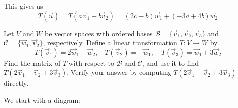\documentclass{ximera}
\begin{document}
\begin{exploration}
This gives us
$$T(\vec{u})=T(a\vec{v}_1+b\vec{v}_2)=(2a-b)\vec{w}_1+(-3a+4b)\vec{w}_2$$

\end{exploration}


\begin{example}\label{ex:transmatrix1}
Let $V$ and $W$ be vector spaces with ordered bases $\mathcal{B}=\{\vec{v}_1, \vec{v}_2, \vec{v}_3\}$ and $\mathcal{C}=\{\vec{w}_1, \vec{w}_2\}$, respectively.  Define a linear transformation $T:V\rightarrow W$ by $$T(\vec{v}_1)=2\vec{w}_1-\vec{w}_2,\quad T(\vec{v}_2)=-\vec{w}_1,\quad T(\vec{v}_3)=\vec{w}_1+3\vec{w}_2$$
Find the matrix of $T$ with respect to $\mathcal{B}$ and $\mathcal{C}$, and use it to find $T(2\vec{v}_1-\vec{v}_2+3\vec{v}_3)$.  Verify your answer by computing $T(2\vec{v}_1-\vec{v}_2+3\vec{v}_3)$ directly.

\begin{explanation}
We start with a diagram:
\begin{center}
\end{center}
\end{explanation}
\end{example}
\end{document}
